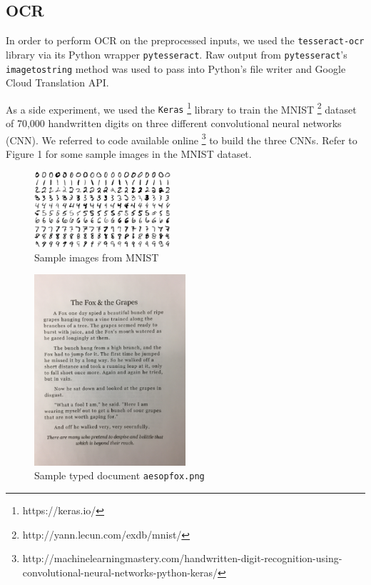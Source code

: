 \documentclass[11pt,letterpaper]{article}
\begin{document}
\subsection{OCR}

In order to perform OCR on the preprocessed inputs, we used the {\tt tesseract-ocr} library via its Python wrapper {\tt pytesseract}. Raw output from {\tt pytesseract}'s {\tt image\textunderscore to\textunderscore string} method was used to pass into Python's file writer and Google Cloud Translation API.

As a side experiment, we used the {\tt Keras} \footnote{https://keras.io/} library to train the MNIST \footnote{http://yann.lecun.com/exdb/mnist/} dataset of 70,000 handwritten digits on three different convolutional neural networks (CNN). We referred to code available online \footnote{http://machinelearningmastery.com/handwritten-digit-recognition-using-convolutional-neural-networks-python-keras/} to build the three CNNs. Refer to Figure 1 for some sample images in the MNIST dataset.

\begin{figure}[t!]
  \centering
  \includegraphics[keepaspectratio, width=0.45\textwidth]{mnist.png}
  \caption{Sample images from MNIST}
\end{figure}

\begin{figure}[t!]
  \centering
  \includegraphics[keepaspectratio, width=0.5\textwidth]{fox.png}
  \caption{Sample typed document {\tt aesop\textunderscore fox.png}}
\end{figure}
\end{document}
